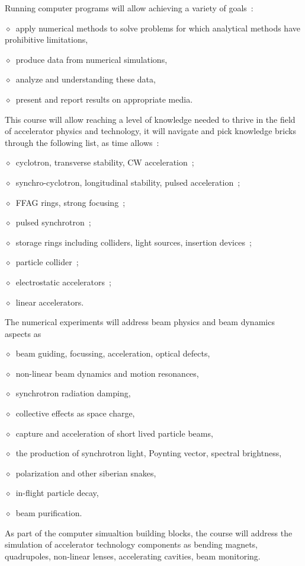 \documentclass[12pt]{article}
\newcommand{\sid}{{\small \ensuremath{\diamond}}~}
\begin{document}
Running computer programs will allow achieving  a variety of goals~: 

\sid apply numerical methods to solve problems for which  analytical methods have prohibitive limitations, 

\sid produce  data from  numerical simulations, 

\sid analyze and understanding these data, 
 
\sid present and report results on appropriate media. 


\bigskip

This course will allow  reaching a level of  knowledge needed to thrive in the field of accelerator physics and technology, 
it will navigate and pick knowledge bricks through the following list, as time allows~: 

\sid cyclotron, transverse stability, CW acceleration~;

\sid synchro-cyclotron,  longitudinal stability,  pulsed acceleration~; 

\sid FFAG rings, strong focusing~;  

\sid pulsed synchrotron~; 

\sid storage rings including colliders, light sources,  insertion devices~; 

\sid particle collider~; 

\sid electrostatic accelerators~; 

\sid linear accelerators. 


The numerical experiments will address  beam physics and beam dynamics aspects as 

\sid beam guiding, focussing, acceleration, optical defects,

\sid non-linear beam dynamics and motion resonances, 

\sid  synchrotron radiation damping, 

\sid collective effects as space charge,

\sid capture and acceleration of short lived particle beams, 

\sid the production of synchrotron light,  Poynting vector, spectral brightness, 

\sid  polarization and other siberian snakes, 

\sid in-flight particle decay,

\sid  beam purification. 


As part of the computer simualtion building blocks, 
the course  will address the simulation of accelerator technology components as bending magnets, quadrupoles, 
non-linear lenses, accelerating cavities, beam monitoring.
\end{document}
